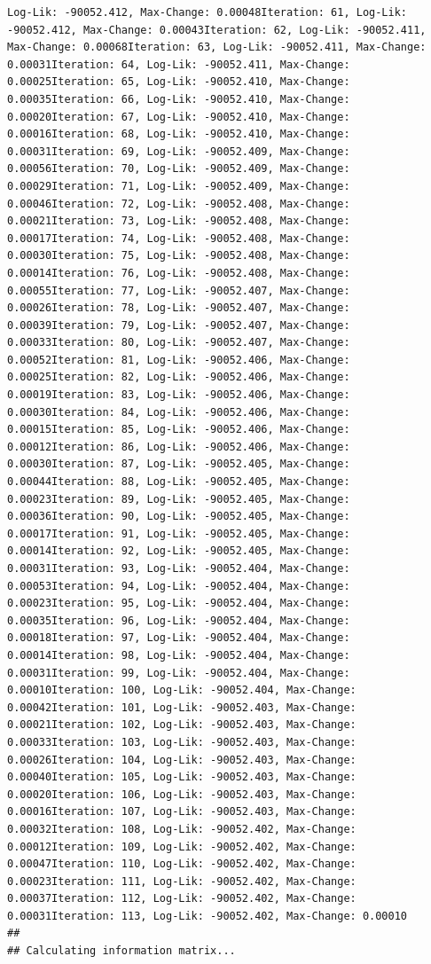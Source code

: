 \documentclass[
  english,
  man,floatsintext]{apa6}
\begin{document}
\begin{verbatim}
Log-Lik: -90052.412, Max-Change: 0.00048Iteration: 61, Log-Lik: -90052.412, Max-Change: 0.00043Iteration: 62, Log-Lik: -90052.411, Max-Change: 0.00068Iteration: 63, Log-Lik: -90052.411, Max-Change: 0.00031Iteration: 64, Log-Lik: -90052.411, Max-Change: 0.00025Iteration: 65, Log-Lik: -90052.410, Max-Change: 0.00035Iteration: 66, Log-Lik: -90052.410, Max-Change: 0.00020Iteration: 67, Log-Lik: -90052.410, Max-Change: 0.00016Iteration: 68, Log-Lik: -90052.410, Max-Change: 0.00031Iteration: 69, Log-Lik: -90052.409, Max-Change: 0.00056Iteration: 70, Log-Lik: -90052.409, Max-Change: 0.00029Iteration: 71, Log-Lik: -90052.409, Max-Change: 0.00046Iteration: 72, Log-Lik: -90052.408, Max-Change: 0.00021Iteration: 73, Log-Lik: -90052.408, Max-Change: 0.00017Iteration: 74, Log-Lik: -90052.408, Max-Change: 0.00030Iteration: 75, Log-Lik: -90052.408, Max-Change: 0.00014Iteration: 76, Log-Lik: -90052.408, Max-Change: 0.00055Iteration: 77, Log-Lik: -90052.407, Max-Change: 0.00026Iteration: 78, Log-Lik: -90052.407, Max-Change: 0.00039Iteration: 79, Log-Lik: -90052.407, Max-Change: 0.00033Iteration: 80, Log-Lik: -90052.407, Max-Change: 0.00052Iteration: 81, Log-Lik: -90052.406, Max-Change: 0.00025Iteration: 82, Log-Lik: -90052.406, Max-Change: 0.00019Iteration: 83, Log-Lik: -90052.406, Max-Change: 0.00030Iteration: 84, Log-Lik: -90052.406, Max-Change: 0.00015Iteration: 85, Log-Lik: -90052.406, Max-Change: 0.00012Iteration: 86, Log-Lik: -90052.406, Max-Change: 0.00030Iteration: 87, Log-Lik: -90052.405, Max-Change: 0.00044Iteration: 88, Log-Lik: -90052.405, Max-Change: 0.00023Iteration: 89, Log-Lik: -90052.405, Max-Change: 0.00036Iteration: 90, Log-Lik: -90052.405, Max-Change: 0.00017Iteration: 91, Log-Lik: -90052.405, Max-Change: 0.00014Iteration: 92, Log-Lik: -90052.405, Max-Change: 0.00031Iteration: 93, Log-Lik: -90052.404, Max-Change: 0.00053Iteration: 94, Log-Lik: -90052.404, Max-Change: 0.00023Iteration: 95, Log-Lik: -90052.404, Max-Change: 0.00035Iteration: 96, Log-Lik: -90052.404, Max-Change: 0.00018Iteration: 97, Log-Lik: -90052.404, Max-Change: 0.00014Iteration: 98, Log-Lik: -90052.404, Max-Change: 0.00031Iteration: 99, Log-Lik: -90052.404, Max-Change: 0.00010Iteration: 100, Log-Lik: -90052.404, Max-Change: 0.00042Iteration: 101, Log-Lik: -90052.403, Max-Change: 0.00021Iteration: 102, Log-Lik: -90052.403, Max-Change: 0.00033Iteration: 103, Log-Lik: -90052.403, Max-Change: 0.00026Iteration: 104, Log-Lik: -90052.403, Max-Change: 0.00040Iteration: 105, Log-Lik: -90052.403, Max-Change: 0.00020Iteration: 106, Log-Lik: -90052.403, Max-Change: 0.00016Iteration: 107, Log-Lik: -90052.403, Max-Change: 0.00032Iteration: 108, Log-Lik: -90052.402, Max-Change: 0.00012Iteration: 109, Log-Lik: -90052.402, Max-Change: 0.00047Iteration: 110, Log-Lik: -90052.402, Max-Change: 0.00023Iteration: 111, Log-Lik: -90052.402, Max-Change: 0.00037Iteration: 112, Log-Lik: -90052.402, Max-Change: 0.00031Iteration: 113, Log-Lik: -90052.402, Max-Change: 0.00010
## 
## Calculating information matrix...
\end{verbatim}
\end{document}
